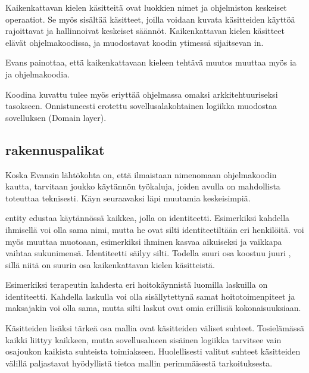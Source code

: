 Kaikenkattavan kielen käsitteitä ovat luokkien nimet ja ohjelmiston
keskeiset operaatiot. Se myös sisältää käsitteet, joilla voidaan kuvata
käsitteiden käyttöä rajoittavat ja hallinnoivat keskeiset säännöt.
Kaikenkattavan kielen käsitteet elävät ohjelmakoodissa, ja muodostavat
koodin ytimessä sijaitsevan in.

Evans painottaa, että kaikenkattavaan kieleen tehtävä muutos muuttaa
myös ia ja ohjelmakoodia.

Koodina kuvattu  tulee myös eriyttää
ohjelmassa omaksi arkkitehtuuriseksi tasokseen. Onnistuneesti erotettu
sovellusalakohtainen logiikka muodostaa sovelluksen
 (Domain layer).

\hypertarget{rakennuspalikat}{%
\subsection{\texorpdfstring{
rakennuspalikat}{ rakennuspalikat}}\label{rakennuspalikat}}

Koska Evansin lähtökohta on, että  ilmaistaan
nimenomaan ohjelmakoodin kautta, tarvitaan joukko käytännön työkaluja,
joiden avulla  on mahdollista toteuttaa
teknisesti. Käyn seuraavaksi läpi muutamia keskeisimpiä.

\Gls{entity} edustaa käytännössä kaikkea, jolla on identiteetti.
Esimerkiksi kahdella ihmisellä voi olla sama nimi, mutta he ovat silti
identiteetiltään eri henkilöitä.  voi myös muuttaa
muotoaan, esimerkiksi ihminen kasvaa aikuiseksi ja vaikkapa vaihtaa
sukunimensä. Identiteetti säilyy silti. Todella suuri osa
 koostuu juuri
, sillä niitä on suurin osa
kaikenkattavan kielen käsitteistä.

Esimerkiksi terapeutin kahdesta eri hoitokäynnistä luomilla laskuilla on
identiteetti. Kahdella laskulla voi olla sisällytettynä samat
hoitotoimenpiteet ja maksajakin voi olla sama, mutta silti laskut ovat
omia erillisiä kokonaisuuksiaan.

Käsitteiden lisäksi tärkeä osa mallia ovat käsitteiden väliset suhteet.
Tosielämässä kaikki liittyy kaikkeen, mutta sovellusalueen sisäinen
logiikka tarvitsee vain osajoukon kaikista suhteista toimiakseen.
Huolellisesti valitut suhteet käsitteiden välillä paljastavat
hyödyllistä tietoa mallin perimmäisestä tarkoituksesta.

